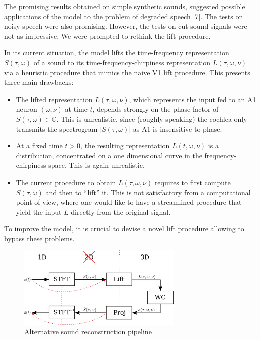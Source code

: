 \documentclass[
  american,
]{article}
\providecommand{\tightlist}{%
  \setlength{\itemsep}{0pt}\setlength{\parskip}{0pt}}
\begin{document}
The promising results obtained on simple synthetic sounds,
suggested possible applications of the model to the problem
of degraded speech {[}\protect\hyperlink{ref-boscain2021}{7}{]}.
The tests on noisy speech were also promising.
However, the tests on cut sound signals were not as impressive.
We were prompted to rethink the lift procedure.

In its current situation, the model lifts the time-frequency representation \(S(\tau,\omega)\)
of a sound to its time-frequency-chirpiness representation \(L(\tau,\omega,\nu)\)
via a heuristic procedure that mimics the naive V1 lift procedure.
This presents three main drawbacks:

\begin{itemize}
\tightlist
\item
  The lifted representation \(L(\tau,\omega,\nu)\), which represents the input fed to an A1 neuron
  \((\omega,\nu)\) at time \(t\), depends strongly on the phase factor of \(S(\tau,\omega)\in\mathbb{C}\).
  This is unrealistic, since (roughly speaking) the cochlea only transmits the spectrogram
  \(\left\lvert S(\tau,\omega)\right\rvert\) as A1 is insensitive to phase.
\item
  At a fixed time \(t>0\), the resulting representation \(L(t,\omega,\nu)\) is a distribution,
  concentrated on a one dimensional curve in the frequency-chirpiness space.
  This is again unrealistic.
\item
  The current procedure to obtain \(L(\tau,\omega,\nu)\) requires to first compute \(S(\tau,\omega)\)
  and then to ``lift'' it.
  This is not satisfactory from a computational point of view, where one would like to have
  a streamlined procedure that yield the input \(L\) directly from the original signal.
\end{itemize}

To improve the model, it is crucial to devise a novel lift procedure allowing to bypass these problems.

\begin{figure}
\centering
\includegraphics[width=0.7\textwidth,height=\textheight]{img/new_pipeline.png}
\caption{Alternative sound reconstruction pipeline}
\end{figure}
\end{document}
